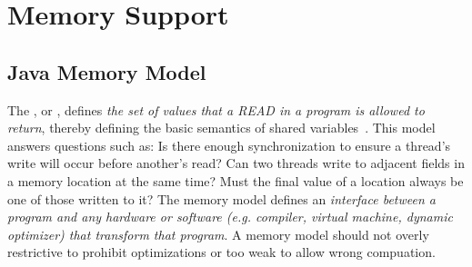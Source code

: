 \chapter{Memory Support}


\section{Java Memory Model}
The , or , defines {\em the
  set of values that a READ in a program is allowed to return\/}, thereby
defining the basic semantics of shared variables~\cite{AB10}. This model
answers questions such as:
  \bit
  \w Is there enough synchronization to ensure a thread's write will occur
  before another's read?
  \w Can two threads write to adjacent fields in a memory location at the same
  time? 
  \w Must the final value of a location always be one of those written to it?
  \eit
The memory model defines an {\em interface between a program and any
  hardware or software (e.g. compiler, virtual machine, dynamic optimizer)
  that transform that program\/}.  A memory model should not overly
restrictive to prohibit optimizations or too weak to allow wrong compuation. 
